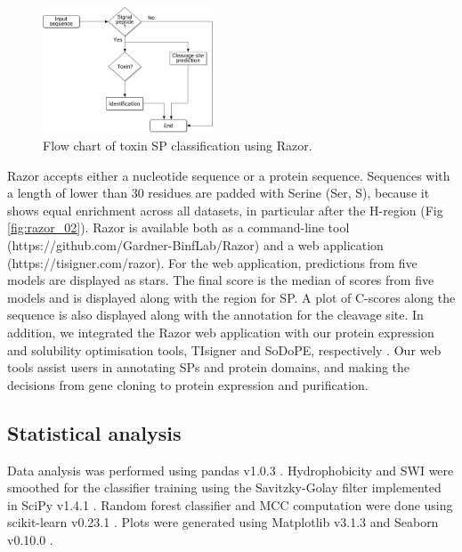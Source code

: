 \begin{figure}
  \begin{center}
    \includegraphics[width=0.45\textwidth]{chapters/Signal_Peptide/Figures/flowchart-fs8.png}
    \caption[Flow chart of toxin SP classification using Razor.]{Flow chart of toxin SP classification using Razor.
    }%
    \label{fig:razor_01}
  \end{center}
\end{figure}

Razor accepts either a nucleotide sequence or a protein sequence. Sequences with a length of lower than 30 residues are padded with Serine (Ser, S), because it shows equal enrichment across all datasets, in particular after the H-region (Fig \ref{fig:razor_02}). Razor is available both as a command-line tool (https://github.com/Gardner-BinfLab/Razor) and a web application (https://tisigner.com/razor). For the web application, predictions from five models are displayed as stars. The final score is the median of scores from five models and is displayed along with the region for SP. A plot of C-scores along the sequence is also displayed along with the annotation for the cleavage site. In addition, we integrated the Razor web application with our protein expression and solubility optimisation tools, TIsigner and SoDoPE, respectively \cite{Bhandari2020-pz,Bhandari2021-wd}. Our web tools assist users in annotating SPs and protein domains, and making the decisions from gene cloning to protein expression and purification.




\subsection{Statistical analysis}
Data analysis was performed using pandas v1.0.3 \cite{McKinney2010-rg}. Hydrophobicity and SWI were smoothed for the classifier training using the Savitzky-Golay filter implemented in SciPy v1.4.1 \cite{Virtanen2020-fq}. Random forest classifier and MCC computation were done using scikit-learn v0.23.1 \cite{Pedregosa2011-cd}. Plots were generated using Matplotlib v3.1.3 and Seaborn v0.10.0 \cite{Hunter2007-ii,Waskom2020-ye}.


